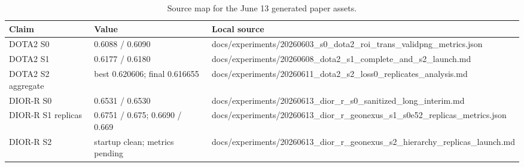 \begin{table}[t]
\centering
\small
\caption{Source map for the June 13 generated paper assets.}
\label{tab:artifact_sources}
\begin{tabular}{lll}
\toprule
Claim & Value & Local source \\
\midrule
DOTA2 S0 & 0.6088 / 0.6090 & docs/experiments/20260603\_s0\_dota2\_roi\_trans\_validpng\_metrics.json \\
DOTA2 S1 & 0.6177 / 0.6180 & docs/experiments/20260608\_dota2\_s1\_complete\_and\_s2\_launch.md \\
DOTA2 S2 aggregate & best 0.620606; final 0.616655 & docs/experiments/20260611\_dota2\_s2\_loss0\_replicates\_analysis.md \\
DIOR-R S0 & 0.6531 / 0.6530 & docs/experiments/20260613\_dior\_r\_s0\_sanitized\_long\_interim.md \\
DIOR-R S1 replicas & 0.6751 / 0.675; 0.6690 / 0.669 & docs/experiments/20260613\_dior\_r\_geonexus\_s1\_s0e52\_replicas\_metrics.json \\
DIOR-R S2 & startup clean; metrics pending & docs/experiments/20260613\_dior\_r\_geonexus\_s2\_hierarchy\_replicas\_launch.md \\
\bottomrule
\end{tabular}
\end{table}
